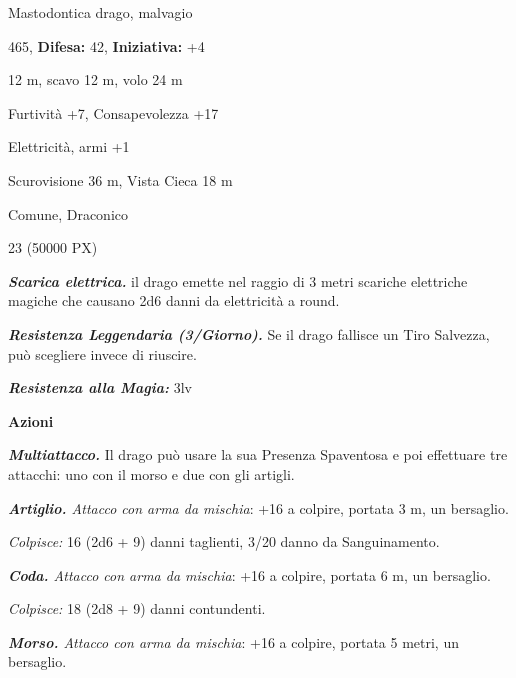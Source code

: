 \begin{multicols}{2}
{
\noindent
\begin{description}[noitemsep, topsep=0pt, parsep=0pt, partopsep=0pt, leftmargin=0cm, labelwidth=2.2cm]
	\item[\textbf{Taglia/Tipo:}] Mastodontica drago, malvagio
	\item[\textbf{Caratt.:}] 
	\item[\textbf{Punti Ferita:}] 465,  \textbf{Difesa:} 42,  \textbf{Iniziativa:} +4
	\item[\textbf{Movimento:}] 12 m, scavo 12 m, volo 24 m
	\item[\textbf{Tiri Salvez.:}] 
	\item[\textbf{Comp.:}] Furtività +7, Consapevolezza +17
	\item[\textbf{Imm. Danni:}] Elettricità, armi +1
	\item[\textbf{Sensi:}] Scurovisione 36 m, Vista Cieca 18 m
	\item[\textbf{Linguaggi:}] Comune, Draconico
	\item[\textbf{Sfida:}] 23 (50000 PX)\smallskip
\end{description}

\emph{\textbf{Scarica elettrica.}} il drago emette nel raggio di 3 metri scariche elettriche magiche che causano 2d6 danni da elettricità a round.

\emph{\textbf{Resistenza Leggendaria (3/Giorno).}} Se il drago fallisce un Tiro Salvezza, può scegliere invece di riuscire.

\emph{\textbf{Resistenza alla Magia:}} 3lv

\textbf{Azioni}

\emph{\textbf{Multiattacco.}} Il drago può usare la sua Presenza Spaventosa e poi effettuare tre attacchi: uno con il morso e due con gli artigli.

\emph{\textbf{Artiglio.} Attacco con arma da mischia}: +16 a colpire,
portata 3 m, un bersaglio.

\emph{Colpisce:} 16 (2d6 + 9) danni taglienti, 3/20 danno da Sanguinamento.

\emph{\textbf{Coda.} Attacco con arma da mischia}: +16 a colpire, portata 6 m, un bersaglio.

\emph{Colpisce:} 18 (2d8 + 9) danni contundenti.

\emph{\textbf{Morso.} Attacco con arma da mischia}: +16 a colpire, portata 5 metri, un bersaglio.

}
\end{multicols}
